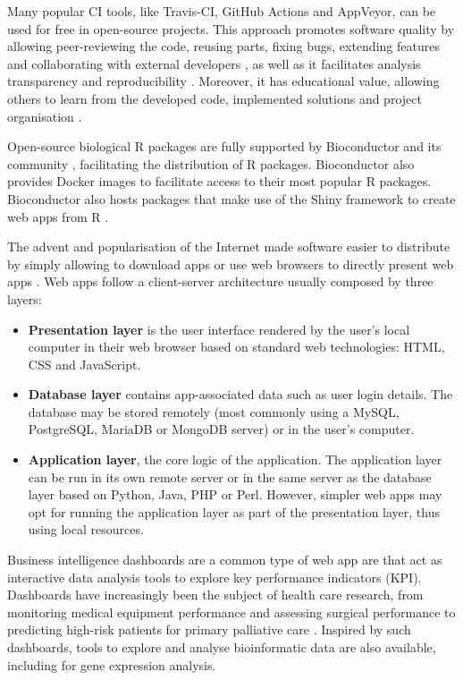Many popular CI tools, like Travis-CI, GitHub Actions and AppVeyor, can be used for free in open-source projects. This approach promotes software quality by allowing peer-reviewing the code, reusing parts, fixing bugs, extending features and collaborating with external developers \cite{silva:2017wl,hewitt:2019uj}, as well as it facilitates analysis transparency and reproducibility \cite{silva:2017wl}. Moreover, it has educational value, allowing others to learn from the developed code, implemented solutions and project organisation \cite{hewitt:2019uj}.

Open-source biological R packages are fully supported by Bioconductor and its community \cite{huber:2015wt}, facilitating the distribution of R packages. Bioconductor also provides Docker images to facilitate access to their most popular R packages. %
Bioconductor also hosts packages that make use of the Shiny framework to create web apps from R \cite{chang:2021ul}.

The advent and popularisation of the Internet made software easier to distribute by simply allowing to download apps or use web browsers to directly present web apps \cite{}. Web apps follow a client-server architecture usually composed by three layers:
\begin{itemize}
	\item \textbf{Presentation layer} is the user interface rendered by the user's local computer in their web browser based on standard web technologies: HTML, CSS and JavaScript.
	\item \textbf{Database layer} contains app-associated data such as user login details. The database may be stored remotely (most commonly using a MySQL, PostgreSQL, MariaDB or MongoDB server) or in the user's computer.
	\item \textbf{Application layer}, the core logic of the application. The application layer can be run in its own remote server or in the same server as the database layer based on Python, Java, PHP or Perl. However, simpler web apps may opt for running the application layer as part of the presentation layer, thus using local resources.
\end{itemize}

Business intelligence dashboards are a common type of web app are that act as interactive data analysis tools to explore key performance indicators (KPI). Dashboards have increasingly been the subject of health care research, from monitoring medical equipment performance \cite{iadanza:2019tj} and assessing surgical performance \cite{baghdadi:2021uc} to predicting high-risk patients for primary palliative care \cite{tan:2020tu}. Inspired by such dashboards, tools to explore and analyse bioinformatic data are also available, including for gene expression analysis.

